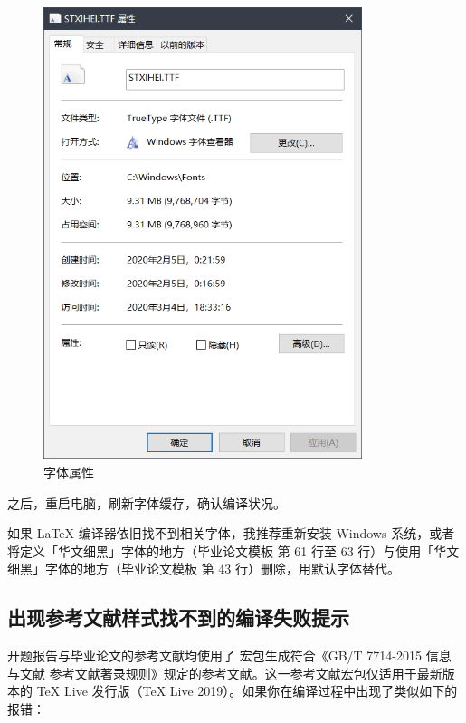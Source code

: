 \begin{figure}[H]
  \flushright
  \includegraphics[width=0.83\textwidth]{images/font_property.png}
  \caption{字体属性}
  \label{font_property}
\end{figure}

之后，重启电脑，刷新字体缓存，确认编译状况。

如果 LaTeX 编译器依旧找不到相关字体，我推荐重新安装 Windows 系统，或者将定义「华文细黑」字体的地方（毕业论文模板  第 61 行至 63 行）与使用「华文细黑」字体的地方（毕业论文模板  第 43 行）删除，用默认字体替代。

\subsection{出现参考文献样式找不到的编译失败提示}

开题报告与毕业论文的参考文献均使用了 \href{https://github.com/hushidong/biblatex-gb7714-2015}{\color{RoyalBlue}{biblatex-gb7714-2015}} 宏包生成符合《GB/T 7714-2015 信息与文献 参考文献著录规则》规定的参考文献。这一参考文献宏包仅适用于最新版本的 TeX Live 发行版（TeX Live 2019）。如果你在编译过程中出现了类似如下的报错：

